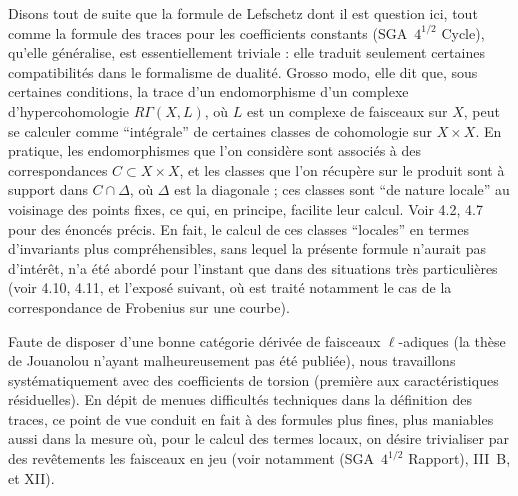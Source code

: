 \documentclass[11pt]{article}
\begin{document}
Disons tout de suite que la formule de Lefschetz dont il est question ici, tout comme la formule des traces pour les coefficients constants (SGA~$4^{1/2}$ Cycle), qu'elle généralise, est essentiellement triviale : elle traduit seulement certaines compatibilités dans le formalisme de dualité. Grosso modo, elle dit que, sous certaines conditions, la trace d'un endomorphisme d'un complexe d'hypercohomologie $R\Gamma(X,L)$, où $L$ est un complexe de faisceaux sur $X$, peut se calculer comme ``intégrale'' de certaines classes de cohomologie sur $X \times X$. En pratique, les endomorphismes que l'on considère sont associés à des correspondances $C \subset X \times X$, et les classes que l'on récupère sur le produit sont à support dans $C \cap \Delta$, où $\Delta$ est la diagonale ; ces classes sont ``de nature locale'' au voisinage des points fixes, ce qui, en principe, facilite leur calcul. Voir 4.2, 4.7 pour des énoncés précis. En fait, le calcul de ces classes ``locales'' en termes d'invariants plus compréhensibles, sans lequel la présente formule n'aurait pas d'intérêt, n'a été abordé pour l'instant que dans des situations très particulières (voir 4.10, 4.11, et l'exposé suivant, où est traité notamment le cas de la correspondance de Frobenius sur une courbe).

Faute de disposer d'une bonne catégorie dérivée de faisceaux $\ell$-adiques 
(la thèse de
Jouanolou n'ayant malheureusement pas été publiée), nous travaillons systématiquement avec des coefficients de torsion (première aux caractéristiques résiduelles). En dépit de menues difficultés techniques dans la définition des traces, ce point de vue conduit en fait à des formules plus fines, plus maniables aussi dans la mesure où, pour le calcul des termes locaux, on désire trivialiser par des revêtements les faisceaux en jeu (voir notamment (SGA~$4^{1/2}$ Rapport), III~B, et XII).
\end{document}
